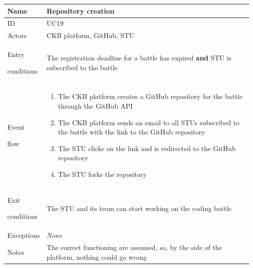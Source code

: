 \begin{center}
    \def\arraystretch{1.5}
    \begin{tabular}{| m{2cm} | m{10cm}|}
        \hline
        Name                  & Repository creation                                                                                              \\ \hline
        ID                    & UC19                                                                                                             \\ \hline
        Actors                & CKB platform, GitHub, STU                                                                                        \\ \hline
        Entry \par conditions & The registration deadline for a battle has expired \textbf{and} STU is subscribed to the battle                  \\ \hline
        Event \par flow       & \begin{enumerate}
                                    \item The CKB platform creates a GitHub repository for the battle through the GitHub API
                                    \item The CKB platform sends an email to all STUs subscribed to the battle with the link to the GitHub repository
                                    \item The STU clicks on the link and is redirected to the GitHub repository
                                    \item The STU forks the repository
                                \end{enumerate} \\ \hline
        Exit \par conditions  & The STU and its team can start working on the coding battle                                                      \\ \hline
        Exceptions            & \textit{None}                                                                                                    \\ \hline
        Notes                 & The correct functioning are assumed, so, by the side of the platform, nothing could go wrong                     \\ \hline
    \end{tabular}
\end{center}
